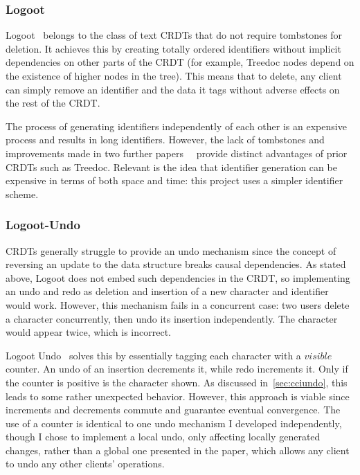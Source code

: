 \documentclass[12pt,a4paper,twoside,openright]{report}
\begin{document}
		\subsubsection{Logoot} \label{sec:logoot}
		
		Logoot~\cite{weiss2008} belongs to the class of text CRDTs that do not require tombstones for deletion. It achieves this by creating totally ordered identifiers without implicit dependencies on other parts of the CRDT (for example, Treedoc nodes depend on the existence of higher nodes in the tree). This means that to delete, any client can simply remove an identifier and the data it tags without adverse effects on the rest of the CRDT.
		
		The process of generating identifiers independently of each other is an expensive process and results in long identifiers. However, the lack of tombstones and improvements made in two further papers~\cite{nedelec2013lseq}~\cite{nedelec2013} provide distinct advantages of prior CRDTs such as Treedoc. Relevant is the idea that identifier generation can be expensive in terms of both space and time: this project uses a simpler identifier scheme.
		
		
		
		\subsubsection{Logoot-Undo} \label{sec:logootundo}
		
		CRDTs generally struggle to provide an undo mechanism since the concept of reversing an update to the data structure breaks causal dependencies. As stated above, Logoot does not embed such dependencies in the CRDT, so implementing an undo and redo as deletion and insertion of a new character and identifier would work. However, this mechanism fails in a concurrent case: two users delete a character concurrently, then undo its insertion independently. The character would appear twice, which is incorrect.
		
		
		Logoot Undo~\cite{weiss2010undo} solves this by essentially tagging each character with a $visible$ counter. An undo of an insertion decrements it, while redo increments it. Only if the counter is positive is the character shown. As discussed in~\cref{sec:cciundo}, this leads to some rather unexpected behavior. However, this approach is viable since increments and decrements commute and guarantee eventual convergence. The use of a counter is identical to one undo mechanism I developed independently, though I chose to implement a local undo, only affecting locally generated changes, rather than a global one presented in the paper, which allows any client to undo any other clients' operations.
\end{document}
